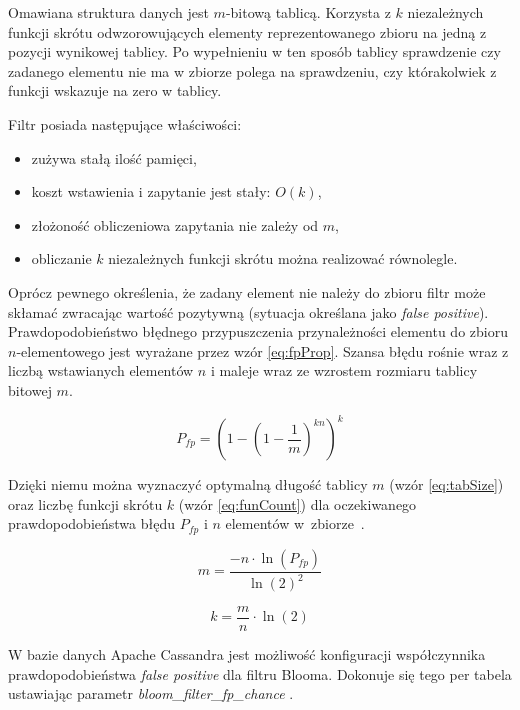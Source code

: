 Omawiana struktura danych jest $m$-bitową tablicą.
Korzysta z $k$ niezależnych funkcji skrótu odwzorowujących elementy reprezentowanego zbioru na jedną z pozycji wynikowej tablicy.
Po wypełnieniu w ten sposób tablicy sprawdzenie czy zadanego elementu nie ma w zbiorze polega na sprawdzeniu, czy którakolwiek z funkcji wskazuje na zero w tablicy.

Filtr posiada następujące właściwości:
\begin{itemize}
    \item zużywa stałą ilość pamięci,
    \item koszt wstawienia i zapytanie jest stały: $O(k)$,
    \item złożoność obliczeniowa zapytania nie zależy od $m$,
    \item obliczanie $k$ niezależnych funkcji skrótu można realizować równolegle.
\end{itemize}

Oprócz pewnego określenia, że zadany element nie należy do zbioru filtr może skłamać zwracając wartość pozytywną (sytuacja określana jako \textit{false positive}).
Prawdopodobieństwo  błędnego  przypuszczenia  przynależności  elementu do zbioru $n$-elementowego jest wyrażane przez wzór \ref{eq:fpProp}.
Szansa błędu rośnie wraz z liczbą wstawianych elementów $n$ i maleje wraz ze wzrostem rozmiaru tablicy bitowej $m$.

\begin{equation} \label{eq:fpProp}
    P_{fp} = \left(1 - \left(1 - \frac{1}{m}\right)^{kn}\right)^k
\end{equation}

Dzięki niemu można wyznaczyć optymalną długość tablicy $m$ (wzór \ref{eq:tabSize}) oraz liczbę funkcji skrótu $k$ (wzór \ref{eq:funCount}) dla oczekiwanego prawdopodobieństwa błędu $P_{fp}$ i $n$ elementów w~zbiorze~\cite{BloomFilter}.

\begin{equation} \label{eq:tabSize}
    m = \frac{-n \cdot \ln{\left(P_{fp}\right)}}{\ln{(2)}^2}
\end{equation}

\begin{equation} \label{eq:funCount}
    k = \frac{m}{n} \cdot \ln{\left(2\right)}
\end{equation}

W bazie danych Apache Cassandra jest możliwość konfiguracji współczynnika prawdopodobieństwa \textit{false positive} dla filtru Blooma.
Dokonuje się tego per tabela ustawiając parametr \textit{bloom\_filter\_fp\_chance} \cite{cassandraBloomConf}. 

